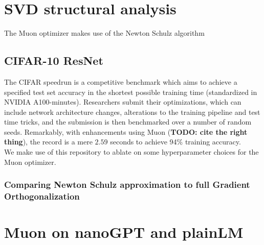 \documentclass[12pt]{book}
\newcommand{\todo}[1]{{\color{red}\bf{TODO: #1}}}
\begin{document}
\section{SVD structural analysis}
The Muon optimizer makes use of the Newton Schulz algorithm 
\subsection{CIFAR-10 ResNet}
The CIFAR speedrun is a competitive benchmark which aims to achieve a specified test set accuracy in the shortest possible training time (standardized in NVIDIA A100-minutes). Researchers submit their optimizations, which can include network architecture changes, alterations to the training pipeline and test time tricks, and the submission is then benchmarked over a number of random seeds. 
Remarkably, with enhancements using Muon (\todo{cite the right thing}), the record is a mere $2.59$ seconds to achieve 94\% training accuracy. 
\\
We make use of this repository to ablate on some hyperparameter choices for the Muon optimizer. 
\subsubsection*{Comparing Newton Schulz approximation to full Gradient Orthogonalization}


\section{Muon on nanoGPT and plainLM} 


\end{document}
